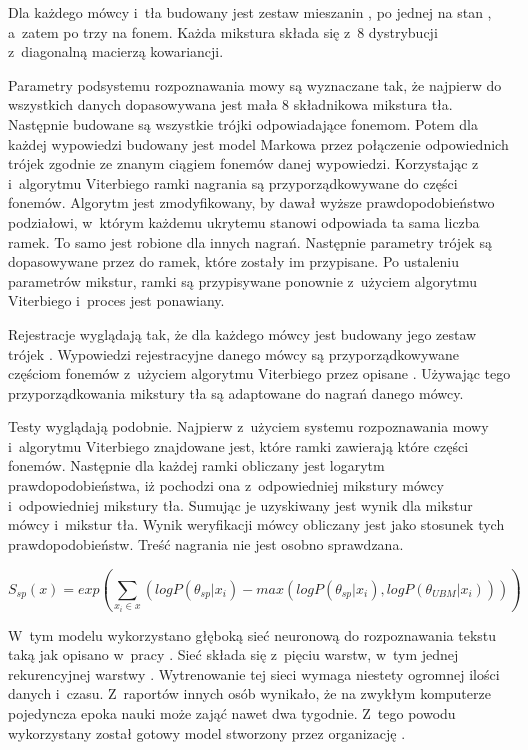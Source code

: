 Dla każdego mówcy i~tła budowany jest zestaw mieszanin , po jednej na stan ,
a~zatem po trzy na fonem. Każda mikstura składa się z~$8$ dystrybucji z~diagonalną macierzą kowariancji.

Parametry podsystemu rozpoznawania mowy są wyznaczane tak, że najpierw do wszystkich danych
dopasowywana jest mała 8 składnikowa mikstura tła. Następnie budowane są wszystkie trójki 
odpowiadające fonemom. Potem dla każdej wypowiedzi budowany jest model Markowa przez połączenie odpowiednich
trójek zgodnie ze znanym ciągiem fonemów danej wypowiedzi. Korzystając z~ i~algorytmu Viterbiego
ramki nagrania są przyporządkowywane do części fonemów. Algorytm jest zmodyfikowany, by dawał wyższe prawdopodobieństwo
podziałowi, w~którym każdemu ukrytemu stanowi odpowiada ta sama liczba ramek. To samo jest robione dla innych nagrań.
Następnie parametry trójek  są dopasowywane przez  do ramek, które zostały im przypisane.
Po ustaleniu parametrów mikstur, ramki są przypisywane ponownie z~użyciem algorytmu Viterbiego i~proces jest ponawiany.

Rejestracje wyglądają tak, że dla każdego mówcy jest budowany jego zestaw trójek .
Wypowiedzi rejestracyjne danego mówcy są przyporządkowywane
częściom fonemów z~użyciem algorytmu Viterbiego przez opisane .
Używając tego przyporządkowania mikstury tła są  adaptowane do nagrań danego mówcy.

Testy wyglądają podobnie. Najpierw z~użyciem systemu rozpoznawania mowy i~algorytmu Viterbiego znajdowane
jest, które ramki zawierają które części fonemów. Następnie dla każdej ramki obliczany jest logarytm prawdopodobieństwa,
iż pochodzi ona z~odpowiedniej mikstury mówcy i~odpowiedniej mikstury tła. Sumując je uzyskiwany jest wynik dla mikstur
mówcy i~mikstur tła. Wynik weryfikacji mówcy obliczany jest jako stosunek tych prawdopodobieństw. Treść
nagrania nie jest osobno sprawdzana.

$$S_{sp}(x) = exp(\sum_{x_i \in x} (log P(\theta_{sp} | x_i) - max(log P(\theta_{sp} | x_i), log P(\theta_{UBM} | x_i))))$$

\label{sec:dnn_gmm}

W~tym modelu wykorzystano głęboką sieć neuronową do rozpoznawania tekstu taką jak opisano w~pracy \cite{endToEnd}.
Sieć składa się z~pięciu warstw, w~tym jednej rekurencyjnej warstwy .
Wytrenowanie tej sieci wymaga niestety ogromnej ilości danych i~czasu. Z~raportów innych osób wynikało, że na
zwykłym komputerze pojedyncza epoka nauki może zająć nawet dwa tygodnie. Z~tego powodu wykorzystany został
gotowy model stworzony przez organizację .

